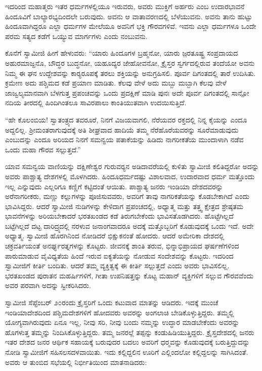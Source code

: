  ಇದರಿಂದ ಮಹಾತ್ಮರು ಇತರ ಧರ್ಮಗಳಲ್ಲಿಯೂ ಇರುವರು, ಅವರು ಮುಕ್ತಿಗೆ ಅರ್ಹರು ಎಂಬ ಉದಾರಭಾವನೆ ಹಿಂದೂವಿಗೆ ಬಾಲ್ಯಾರಭ್ಯದಿಂದಲೇ ಬರುವುದು. ಅವನು ಆ ವಾತಾವರಣದಲ್ಲಿ ಬೆಳೆಯುವನು. ಅವನು ತಾನು ಹುಟ್ಟು ಹಿಂದೂವಾಗಿದ್ದರೂ ಎಲ್ಲಾ ಧರ್ಮಗಳ ಮೇಲೆಯೂ ಅವನಿಗೆ ಭಕ್ತಿ ಗೌರವಗಳಿವೆ. ಇವನು ಎಲ್ಲಾ ಧರ್ಮಗಳೂ ಒಂದೇ ಪರಮ ಸತ್ಯದ ಕಡೆಗೆ ಒಯ್ಯುವ ಮಾರ್ಗಗಳು ಎಂದು ನಂಬುವನು. 

 ಕೊನೆಗೆ ಸ್ವಾಮೀಜಿ ಹೀಗೆ ಹೇಳುವರು: “ಯಾರು ಹಿಂದೂಗಳ ಬ್ರಹ್ಮನೋ, ಯಾರು ಜ಼ರತೂಷ್ಟ್ರ ಸಂಪ್ರದಾಯದ ಅಹುರಮಾಜ್ದನೊ, ಬೌದ್ಧರ ಬುದ್ಧನೋ, ಯಹೂದ್ಯರ ಜೇಹೋವನೋ, ಕ್ರೈಸ್ತರ ಸ್ವರ್ಗದಲ್ಲಿರುವ ತಂದೆಯೋ ಅವನು ನಿಮ್ಮ ಈ ಘನ ಉದ್ದೇಶವನ್ನು ಕಾರ‍್ಯರೂಪಕ್ಕೆ ತರಲು ಶಕ್ತಿಯನ್ನು ಅನುಗ್ರಹಿಸಲಿ. ಪೂರ್ವ ದಿಗಂತದಲ್ಲಿ ತಾರೆ ಉದಿಸಿತು. ಕ್ರಮೇಣ ಅದು ಪಶ್ಚಿಮದ ಕಡೆ ಪ್ರಯಾಣ ಮಾಡಿತು. ಕೆಲವು ವೇಳೆ ಅದು ಮಬ್ಬು ಮಬ್ಬಾಗಿ ಕೆಲವು ವೇಳೆ ಜಾಜ್ವಲ್ಯಮಾನವಾಗಿ ಬೆಳಗುತ್ತ ಪ್ರಪಂಚವನ್ನು ಒಂದು ಪ್ರದಕ್ಷಿಣೆ ಮಾಡಿ ಪುನಃ ಅದೇ ಪೂರ್ವ ದಿಗಂತದಲ್ಲಿ ಸಾನ್ಪೋ ನದಿಯ ತೀರದಲ್ಲಿ ಹಿಂದಿಗಿಂತಲೂ ಸಾವಿರಪಾಲು ಕಾಂತಿಯುತವಾಗಿ ಉದಯಿಸುತ್ತಿದೆ. 

 “ಹೇ ಕೊಲಂಬಿಯ! ಸ್ವಾತಂತ್ರ್ಯದ ತವರೂರೆ, ನಿನಗೆ ವಿಜಯವಾಗಲಿ, ನೆರೆಯವರ ರಕ್ತದಲ್ಲಿ ನಿನ್ನ ಕೈಯನ್ನು ಎಂದೂ ಅದ್ದಲಿಲ್ಲ. ಶ‍್ರೀಮಂತರಾಗುವುದಕ್ಕೆ ಅತಿ ಶೀಘ್ರವಾದ ಹಾದಿಯೆ ತಮ್ಮ ನೆರೆಹೊರೆಯವರನ್ನು ಸೂರೆಮಾಡುವುದು ಎಂಬುದನ್ನು ಎಂದೂ ಅರಿಯದ ನಿನಗೆ ಸಮನ್ವಯ ಪತಾಕೆಯನ್ನು ಹಿಡಿದು ನಾಗರೀಕತೆಯ ಮುಂದಾಳಾಗಿ ನಡೆವ ಒಂದು ಮಹಾ ಗೌರವ ಸಲ್ಲುತ್ತದೆ.” 

 ಯಾವ ಸಮನ್ವಯ ವಾಣಿಯನ್ನು ದಕ್ಷಿಣೇಶ್ವರ ಗುರುವರ‍್ಯನ ಅಡಿದಾವರೆಯಲ್ಲಿ ಕುಳಿತು ಸ್ವಾಮೀಜಿ ಕಲಿತಿದ್ದರೋ ಅದನ್ನು ಅವರು ಪಾಶ್ಚಾತ್ಯ ದೇಶಗಳಲ್ಲಿ ಮೊಳಗಿದರು. ಹಿಂದೂಧರ್ಮದಷ್ಟು ವಿಶಾಲವಾದ, ಉದಾರವಾದ ಧರ್ಮ ಮತ್ತೊಂದು ಇಲ್ಲ ಎನ್ನುವುದು ಎಲ್ಲರಿಗೂ ಕಣ್ಣಿಗೆ ಕಟ್ಟಿದಂತೆ ಆಯಿತು. ಪಾಶ್ಚಾತ್ಯ ಜನರು ಇಂಡಿಯಾ ದೇಶದವರನ್ನು ಅರೆನಾಗರೀಕರು, ಮಣ್ಣು ಕಲ್ಲುಗಳನ್ನು ಪೂಜಿಸುವವರು, ಅವರಿಗೆ ತಾವು ನಾಗರಿಕತೆಯನ್ನು ಕೊಡಬೇಕಾಗಿದೆ ಎಂದು ಭಾವಿಸಿದ್ದರು. ಆದರೆ ಸ್ವಾಮೀಜಿ ನುಡಿಗಳನ್ನು ಕೇಳಿದಾಗ ಪ್ರಪಂಚದಲ್ಲಿ, ಅಧ್ಯಾತ್ಮ ಮತ್ತು ತತ್ತ್ವ ಕ್ಷೇತ್ರದ ಶ್ರೇಷ್ಠತಮ ಭಾವನೆಗಳನ್ನು ಅರಿಯಬೇಕಾದರೆ ಭರತಖಂಡದ ಕಡೆ ತಿರುಗಬೇಕೆಂದು ಭಾವಿಸತೊಡಗಿದರು. ಹೊಟ್ಟೆಗಿಲ್ಲದೆ ಬಟ್ಟೆಗಿಲ್ಲದೆ ದಟ್ಟ ದಾರಿದ್ರ್ಯದಲ್ಲಿ ನರಳುವ ಜನಾಂಗವಾದರೂ ಅದಕ್ಕೆ ಮತ್ತೊಬ್ಬರಿಗೆ ಕೊಡುವುದಕ್ಕೆ ಒಂದು ಇದೆ. ಅದೇ ಅಧ್ಯಾತ್ಮ. ಸ್ವಾಮೀಜಿ ಹೊರಗಿನಿಂದ ನೋಡಿದರೆ ಭಿಕ್ಷುಕನಂತೆ ಹೋದರು. ಆದರೆ ಅಮೇರಿಕಾ ದೇಶದಲ್ಲಿ ಚಕ್ರವರ್ತಿಯಂತೆ ಅನರ್ಘ್ಯರತ್ನಗಳನ್ನು ಕೊಟ್ಟರು. ಜೀವನಕ್ಕೆ ಶಾಂತಿ ತರುವ, ಭಿನ್ನಾಭಿಪ್ರಾಯದ ಘರ್ಷಣೆಗಳಿಂದ ಪಾರುಮಾಡುವ ವೈವಿಧ್ಯತೆಯ ಹಿಂದೆ ಇರುವ ಐಕ್ಯತೆಯನ್ನು ನೋಡುವ ಸಂದೇಶವನ್ನು ಕೊಟ್ಟರು. ಇದರಿಂದ ಸ್ವಾಮೀಜಿಗೆ ಕೀರ್ತಿ ಬಂದಿತು. ಆದರೆ ತಮ್ಮ ವ್ಯಕ್ತಿತ್ವಕ್ಕೆ ಈ ಕೀರ್ತಿ ಸಲ್ಲುತ್ತದೆ ಎಂದು ಅವರು ಭಾವಿಸಲಿಲ್ಲ. ಭರತಖಂಡದ ಪುರಾತನ ಮಹರ್ಷಿಗಳಿಗೆ, ಗೀತಾ ಉಪನಿಷತ್ತನ್ನು ಕೊಟ್ಟ ಮಹಾನ್ ವ್ಯಕ್ತಿಗಳಿಗೆ ಸಲ್ಲುವ ಗೌರವವೆಂದು ಅವರ ಪರವಾಗಿ ಅದನ್ನು ಸ್ವೀಕರಿಸಿದರು. 

 ಸ್ವಾಮೀಜಿ ಸೆಪ್ಟೆಂಬರ್ ೨೦ರಂದು ಕ್ರೈಸ್ತರಿಗೆ ಒಂದು ಕಟುವಾದ ಮಾತನ್ನು ಆಡಿದರು. ಇದಕ್ಕೆ ಮುಂಚೆ ಇಂಡಿಯಾದೇಶದಿಂದ ಪಶ್ಚಿಮದೇಶಗಳಿಗೆ ಹೋದವರು ಅವರನ್ನು ಅಂಗಲಾಚಿ ಬೇಡಿಕೊಳ್ಳುತ್ತಿದ್ದರು. ತಮ್ಮಲ್ಲಿ ಯೋಗ್ಯವಾಗಿರುವುದು ಏನೂ ಇಲ್ಲ, ನೀವು ಸರಿ, ನೀವು ಬಂದು ನಮ್ಮನ್ನು ಉದ್ಧಾರ ಮಾಡಬೇಕೆಂದು ಅವರನ್ನು ಹೊಗಳುತ್ತ ತಮ್ಮನ್ನು ನಿಂದಿಸಿಕೊಳ್ಳುತ್ತಿದ್ದರು. ತಮ್ಮ ಜನರಲ್ಲೆ ತಪ್ಪನ್ನು ಕಂಡುಹಿಡಿಯುತ್ತಿದ್ದರು. ಕ್ರೈಸ್ತದೇಶದಲ್ಲಿ ಜನರು ಇತರ ದೇಶದ ಜನರ ಆರ್ಥಿಕ ಸಹಾಯಕ್ಕೆ ಬರುವುದರ ಬದಲು ಅವರಿಗೆ ಧರ‍್ಮವನ್ನು ಕೊಡುವುದಕ್ಕೆ ಬರುತ್ತಿದ್ದುದನ್ನು ನೋಡಿ ಸ್ವಾಮೀಜಿಗೆ ಸಹಿಸಲಸದಳವಾಯಿತು. ಇದು ಕಲ್ಲಿದ್ದಲಿನ ಊರಿಗೆ ಎಲ್ಲಿಂದಲೋ ಕಲ್ಲಿದ್ದಲನ್ನು ಸಾಗಿಸಿದಂತೆ. ಅವರು ಆ ತುಂಬಿದ ಸಭೆಯಲ್ಲಿ ನಿರ್ಭೀತಿಯಿಂದ ಮಾತನಾಡಿದರು: 

